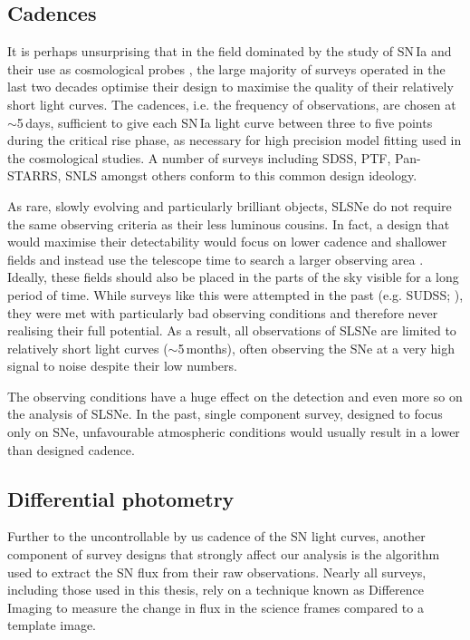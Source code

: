 \subsection{Cadences}
It is perhaps unsurprising that in the field dominated by the study of SN\,Ia and their use as cosmological probes \citep{Perlmutter1999,Riess1998}, the large majority of surveys operated in the last two decades optimise their design to maximise the quality of their relatively short light curves. The cadences, i.e. the frequency of observations, are chosen at $\sim$5\,days, sufficient to give each SN\,Ia light curve between three to five points during the critical rise phase, as necessary for high precision model fitting used in the cosmological studies. A number of surveys including SDSS, PTF, Pan-STARRS, SNLS amongst others conform to this common design ideology.

As rare, slowly evolving and particularly brilliant objects, SLSNe do not require the same observing criteria as their less luminous cousins. In fact, a design that would maximise their detectability would focus on lower cadence and shallower fields and instead use the telescope time to search a larger observing area \citep{Scovacricchi2016}. Ideally, these fields should also be placed in the parts of the sky visible for a long period of time. While surveys like this were attempted in the past (e.g. SUDSS; ), they were met with particularly bad observing conditions and therefore never realising their full potential. As a result, all observations of SLSNe are limited to relatively short light curves ($\sim$5\,months), often observing the SNe at a very high signal to noise despite their low numbers.

The observing conditions have a huge effect on the detection and even more so on the analysis of SLSNe. In the past, single component survey, designed to focus only on SNe, unfavourable atmospheric conditions would usually result in a lower than designed cadence. 

\subsection{Differential photometry}
Further to the uncontrollable by us cadence of the SN light curves, another component of survey designs that strongly affect our analysis is the algorithm used to extract the SN flux from their raw observations. Nearly all surveys, including those used in this thesis, rely on a technique known as Difference Imaging \citep{Alard1997} to measure the change in flux in the science frames compared to a template image.

